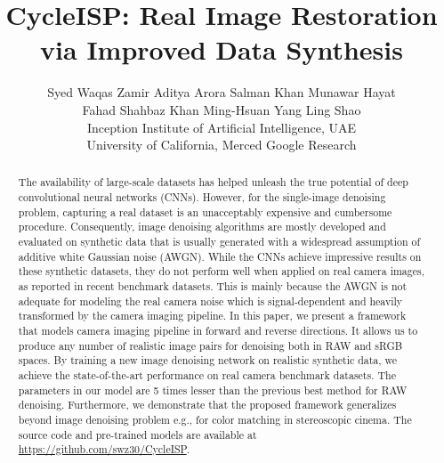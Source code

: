 \documentclass[10pt,twocolumn,letterpaper]{article}
\title{\vspace{-0.7em}CycleISP: Real Image Restoration via Improved Data Synthesis}
\begin{document}
\author{Syed Waqas Zamir \quad Aditya Arora \quad Salman Khan \quad Munawar Hayat \\ 
Fahad Shahbaz Khan  \quad Ming-Hsuan Yang \quad Ling Shao \\
Inception Institute of Artificial Intelligence,  UAE\\
University of California, Merced \quad Google Research 
}

\maketitle


\begin{abstract}\vspace{-1.0em}
The availability of large-scale datasets has helped unleash the true potential of deep convolutional neural networks (CNNs).
However, for the single-image denoising problem, capturing a real dataset is an unacceptably expensive and cumbersome procedure. 
Consequently, image denoising algorithms are mostly developed and evaluated on synthetic data that is usually generated with a widespread assumption of additive white Gaussian noise (AWGN). 
While the CNNs achieve impressive results on these synthetic datasets, they do not perform well when applied on real camera images, as reported in recent benchmark datasets. 
This is mainly because the AWGN is not adequate for modeling the real camera noise which is signal-dependent and heavily transformed by the camera imaging pipeline. 
In this paper, we present a framework that models camera imaging pipeline in forward and reverse directions. 
It allows us to produce any number of realistic image pairs for denoising both in RAW and sRGB spaces. 
By training a new image denoising network on realistic synthetic data, we achieve the state-of-the-art performance on real camera benchmark datasets. The parameters in our model are 5 times lesser than the previous best method for RAW denoising.  
Furthermore, we demonstrate that the proposed framework generalizes beyond image denoising problem e.g., for color matching in stereoscopic cinema.
The source code and pre-trained models are available at \url{https://github.com/swz30/CycleISP}.
\end{abstract}
\vspace{-0.3cm}
\end{document}
